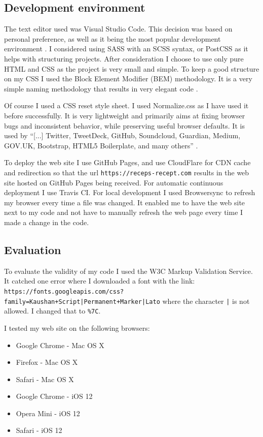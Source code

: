 \documentclass[a4paper]{scrartcl}
\begin{document}
\subsection{Development environment}
\label{method:development}

The text editor used was Visual Studio Code. This decision was based on personal preference, as well as it being the most popular development environment \cite{Stackoverflow}. I considered using SASS with an SCSS syntax, or PostCSS as it helps with structuring projects. After consideration I choose to use only pure HTML and CSS as the project is very small and simple. To keep a good structure on my CSS I used the Block Element Modifier (BEM) methodology. It is a very simple naming methodology that results in very elegant code \cite{Starkov}.

Of course I used a CSS reset style sheet. I used Normalize.css as I have used it before successfully. It is very lightweight and primarily aims at fixing browser bugs and inconsistent behavior, while preserving useful browser defaults. It is used by ``[...] Twitter, TweetDeck, GitHub, Soundcloud, Guardian, Medium, GOV.UK, Bootstrap, HTML5 Boilerplate, and many others'' \cite{Gallagher}.

To deploy the web site I use GitHub Pages, and use CloudFlare for CDN cache and redirection so that the url \texttt{https://receps-recept.com} results in the web site hosted on GitHub Pages being received. For automatic continuous deployment I use Travis CI. For local development I used Browsersync to refresh my browser every time a file was changed. It enabled me to have the web site next to my code and not have to manually refresh the web page every time I made a change in the code.

\subsection{Evaluation}
\label{method:evaluation}

To evaluate  the validity of my code I used the W3C Markup Validation Service. It catched one error where I downloaded a font with the link:\\ \small{\texttt{https://fonts.googleapis.com/css?family=Kaushan+Script|Permanent+Marker|Lato}} where the character \texttt{|} is not allowed. I changed that to \texttt{\%7C}.

I tested my web site on the following browsers:
\begin{itemize}
	\item Google Chrome - Mac OS X
	\item Firefox - Mac OS X
	\item Safari - Mac OS X
	\item Google Chrome - iOS 12
	\item Opera Mini - iOS 12
	\item Safari - iOS 12
\end{itemize}
\end{document}
